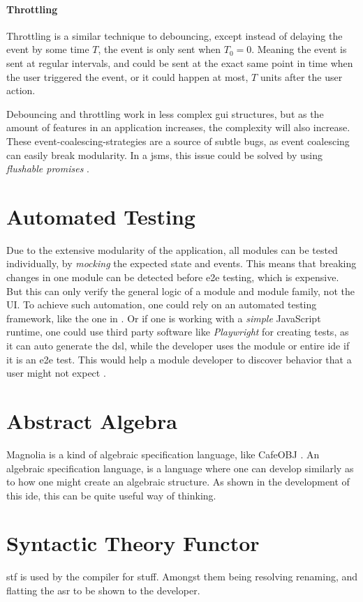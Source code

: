 \paragraph{Throttling} Throttling is a similar technique to debouncing, except
instead of delaying the event by some time $T$, the event is only sent when
$T_0 = 0$. Meaning the event is sent at regular intervals, and could be sent at
the exact same point in time when the user triggered the event, or it could
happen at most, $T$ units after the user action.

Debouncing and throttling work in less complex \gls{gui} structures, but as the
amount of features in an application increases, the complexity will also
increase. These event-coalescing-strategies are a source of subtle bugs, as
event coalescing can easily break modularity. In a \gls{jsms}, this issue could
be solved by using \textit{flushable promises} \cite{flush}.


\section{Automated Testing}
Due to the extensive modularity of the application, all modules can be tested
individually, by \textit{mocking} the expected state and events. This means that
breaking changes in one module can be detected before \gls{e2e} testing, which
is expensive.  But this can only verify the general logic of a
module and module family, not the UI. To achieve such automation, one could rely
on an automated testing framework, like the one in \cite{autoUi}. Or if one is
working with a \textit{simple} JavaScript runtime, one could use third party
software like \textit{Playwright} for creating tests, as it can auto generate
the \gls{dsl}, while the developer uses the module or entire \gls{ide} if it is
an \gls{e2e} test. This would help a module developer to discover behavior that
a user might not expect \cite{leastGui}.


\section{Abstract Algebra}

Magnolia is a kind of algebraic specification language, like CafeOBJ
\cite{cafeObj}. An algebraic specification language, is a language where one can
develop similarly as to how one might create an algebraic structure. As shown in
the development of this \gls{ide}, this can be quite useful way of thinking.


\section{Syntactic Theory Functor}

\gls{stf} is used by the compiler \cite{wiig} for stuff. Amongst them being
resolving renaming, and flatting the \gls{asr} to be shown to the developer.
